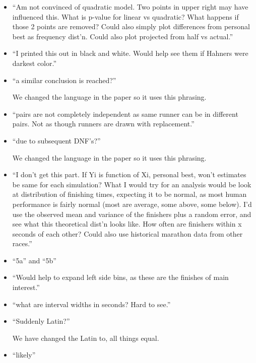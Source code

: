 \documentclass[12pt]{article}
\begin{document}
\begin{itemize}
\item ``Am not convinced of quadratic model. Two points in upper right
  may have influenced this. What is p-value for linear vs quadratic?
  What happens if those 2 points are removed? Could also simply plot
  differences from personal best as frequency dist'n. Could also plot
  projected from half vs actual.''

\item ``I printed this out in black and white. Would help see them if
  Hahners were darkest color.''

\item ``a similar conclusion is reached?''

  We changed the language in the paper so it uses this phrasing.

\item ``pairs are not completely independent as same runner can be in
  different pairs. Not as though runners are drawn with replacement.''

\item ``due to subsequent DNF's?''

  We changed the language in the paper so it uses this phrasing.

\item ``I don't get this part. If Yi is function of Xi, personal best,
  won't estimates be same for each simulation?  What I would try for
  an analysis would be look at distribution of finishing times,
  expecting it to be normal, as most human performance is fairly
  normal (most are average, some above, some below). I'd use the
  observed mean and variance of the finishers plus a random error, and
  see what this theoretical dist'n looks like. How often are finishers
  within x seconds of each other? Could also use historical marathon
  data from other races.''

\item ``5a'' and ``5b''

\item ``Would help to expand left side bins, as these are the finishes
  of main interest.''

\item ``what are interval widths in seconds? Hard to see.''

\item ``Suddenly Latin?''

  We have changed the Latin to, all things equal.

\item ``likely''


\end{itemize}

 
\end{document}
